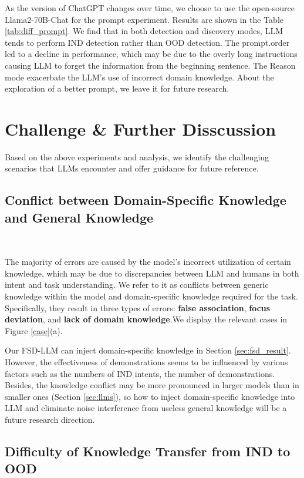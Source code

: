 \documentclass[10pt, a4paper]{article}
\begin{document}
As the version of ChatGPT changes over time, we choose to use the open-source Llama2-70B-Chat for the prompt experiment. Results are shown in the Table \ref{tab:diff_prompt}. We find that in both detection and discovery modes, LLM tends to perform IND detection rather than OOD detection. The prompt.order led to a decline in performance, which may be due to the overly long instructions causing LLM to forget the information from the beginning sentence. The Reason mode exacerbate the LLM's use of incorrect domain knowledge. About the exploration of a better prompt, we leave it for future research.


\section{Challenge \& Further Disscussion}
\label{sec:discussion}
Based on the above experiments and analysis, we identify the challenging scenarios that LLMs encounter and offer guidance for future reference.

\subsection{Conflict between Domain-Specific Knowledge and General Knowledge}\

The majority of errors are caused by the model's incorrect utilization of certain knowledge, which may be due to discrepancies between LLM and humans in both intent and task understanding. We refer to it as conflicts between generic knowledge within the model and domain-specific knowledge required for the task. Specifically, they result in three types of errors: \textbf{false association}, \textbf{focus deviation}, and \textbf{lack of domain knowledge}.We display the relevant cases in Figure \ref{case}(a). 

Our FSD-LLM can inject domain-specific knowledge in Section \ref{sec:fsd_result}. However, the effectiveness of demonstrations seems to be influenced by various factors such as the numbers of IND intents, the number of demonstrations. Besides, the knowledge conflict may be more pronounced in larger models than in smaller ones (Section \ref{sec:llms}), so how to inject domain-specific knowledge into LLM and eliminate noise interference from useless general knowledge will be a future research direction. 

\subsection{Difficulty of Knowledge Transfer from IND to OOD}
\end{document}

